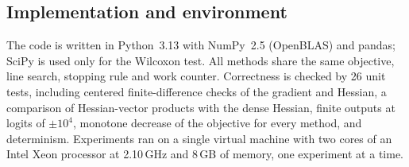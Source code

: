 \subsection{Implementation and environment}
The code is written in Python~3.13 with NumPy~2.5 (OpenBLAS) and pandas; SciPy is used
only for the Wilcoxon test. All methods share the same objective, line search,
stopping rule and work counter. Correctness is checked by 26 unit tests, including
centered finite-difference checks of the gradient and Hessian, a comparison of
Hessian-vector products with the dense Hessian, finite outputs at logits of
$\pm10^4$, monotone decrease of the objective for every method, and determinism.
Experiments ran on a single virtual machine with two cores of an Intel Xeon
processor at 2.10\,GHz and 8\,GB of memory, one experiment at a time.
